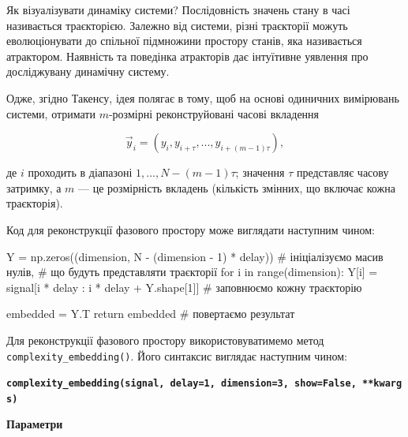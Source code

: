 \documentclass[
  letterpaper,
]{report}
\newenvironment{Shaded}{\begin{snugshade}}{\end{snugshade}}
\newcommand{\NormalTok}[1]{\textcolor[rgb]{0.00,0.23,0.31}{#1}}
\begin{document}
Як візуалізувати динаміку системи? Послідовність значень стану в часі
називається траєкторією. Залежно від системи, різні траєкторії можуть
еволюціонувати до спільної підмножини простору станів, яка називається
атрактором. Наявність та поведінка атракторів дає інтуїтивне уявлення
про досліджувану динамічну систему.

Одже, згідно Такенсу, ідея полягає в тому, щоб на основі одиничних
вимірювань системи, отримати \(m\)-розмірні реконструйовані часові
вкладення

\[
    \vec{y}_i = \left( y_i, y_{i+\tau}, ... , y_{i+(m-1)\tau} \right), \tag{1}
\]

де \(i\) проходить в діапазоні \(1,..., N-(m-1)\tau\); значення \(\tau\)
представляє часову затримку, а \(m\) --- це розмірність вкладень
(кількість змінних, що включає кожна траєкторія).

Код для реконструкції фазового простору може виглядати наступним чином:

\begin{Shaded}
\begin{Highlighting}[]
\NormalTok{Y = np.zeros((dimension, N {-} (dimension {-} 1) * delay)) \# ініціалізуємо масив нулів,}
\NormalTok{                                                       \# що будуть представляти траєкторії}
\NormalTok{for i in range(dimension):}
\NormalTok{    Y[i] = signal[i * delay : i * delay + Y.shape[1]]  \# заповнюємо кожну траєкторію }

\NormalTok{embedded = Y.T                                          }
\NormalTok{return embedded                                        \# повертаємо результат }
\end{Highlighting}
\end{Shaded}

Для реконструкції фазового простору використовуватимемо метод
\texttt{complexity\_embedding()}. Його синтаксис виглядає наступним
чином:

\textbf{\texttt{complexity\_embedding(signal,\ delay=1,\ dimension=3,\ show=False,\ **kwargs)}}

\textbf{Параметри}
\end{document}
